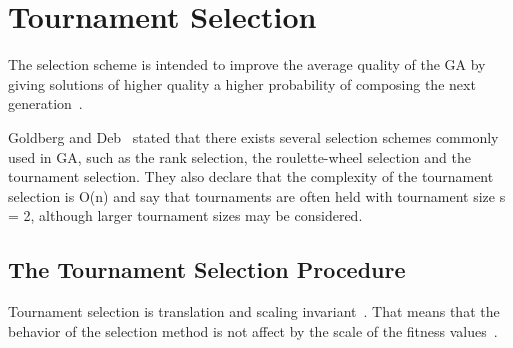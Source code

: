 \section{Tournament Selection}\label{sec:background:Selection Scheme} 

The selection scheme is intended to improve the average quality of the GA by giving solutions of higher quality a higher probability of composing the next generation~\cite{blickle1995mathematical}.

Goldberg and Deb~\cite{goldberg1991comparative} stated that there exists several selection schemes commonly used in GA, such as the rank selection, the roulette-wheel selection and the tournament selection. They also declare that the complexity of the tournament selection is O(n) and say that tournaments are often held with tournament size s = 2, although larger tournament sizes may be considered.

\subsection{The Tournament Selection Procedure}\label{sec:background:tournament_selection} 

Tournament selection is translation and scaling invariant~\cite{maza1993analysis}. That means that the behavior of the selection method is not affect by the scale of the fitness values~\cite{back2000evolutionary}.

